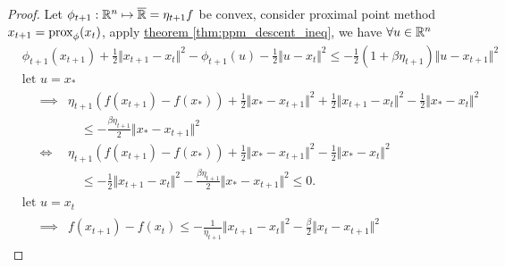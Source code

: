 \documentclass[12pt]{article}
\begin{document}
        \begin{proof}
            Let $\phi_{t + 1}: \mathbb R^n \mapsto \overline {\mathbb R} = \eta_{t + 1} f$ be convex,  consider proximal point method $x_{t + 1} = \operatorname{prox}_{\phi}(x_t)$, apply \hyperref[thm:ppm_descent_ineq]{theorem \ref*{thm:ppm_descent_ineq}}, we have $\forall u \in \mathbb R^n$
            \begin{align*}
                & \phi_{t + 1}(x_{t + 1}) 
                + 
                \frac{1}{2}\Vert x_{t + 1} - x_t\Vert^2
                - \phi_{t + 1}(u) - \frac{1}{2}\Vert u - x_t\Vert^2
                \le 
                - 
                \frac{1}{2}(1 + \beta\eta_{t + 1})\Vert 
                    u - x_{t + 1}
                \Vert^2
                \\
                & \text{let } u = x_*
                \\
                &\quad 
                \begin{aligned}
                    \implies &
                    \eta_{t + 1}(f(x_{t + 1}) - f(x_*)) 
                    + 
                    \frac{1}{2}\Vert x_* - x_{t + 1}\Vert^2 
                    +  
                    \frac{1}{2}\Vert x_{t + 1} - x_t\Vert^2
                    -
                    \frac{1}{2}\Vert x_* - x_t\Vert^2 
                    \\
                    & \quad \le 
                    -\frac{\beta\eta_{t + 1}}{2}\Vert x_* - x_{t + 1}\Vert^2
                    \\
                    \iff & 
                    \eta_{t + 1}(f(x_{t + 1}) - f(x_*)) 
                    + 
                    \frac{1}{2}\Vert x_* - x_{t + 1}\Vert^2 
                    -
                    \frac{1}{2}\Vert x_* - x_t\Vert^2 
                    \\
                    & \quad \le 
                    - \frac{1}{2}\Vert x_{t + 1} - x_t\Vert^2
                    -\frac{\beta\eta_{t + 1}}{2}\Vert x_* - x_{t + 1}\Vert^2
                    \le 0. 
                \end{aligned}
                \\
                & \text{let } u = x_{t}
                \\
                &\quad  
                \begin{aligned}
                    \implies& 
                    f(x_{t + 1}) - f(x_t)
                    \le 
                    -\frac{1}{\eta_{t+1}} \Vert x_{t + 1} - x_t\Vert^2 
                    - \frac{\beta}{2}\Vert x_t - x_{t + 1}\Vert^2

\end{aligned}
\end{align*}
\end{proof}
\end{document}
